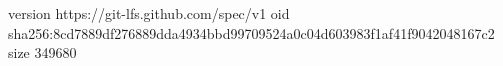 version https://git-lfs.github.com/spec/v1
oid sha256:8cd7889df276889dda4934bbd99709524a0c04d603983f1af41f9042048167c2
size 349680
